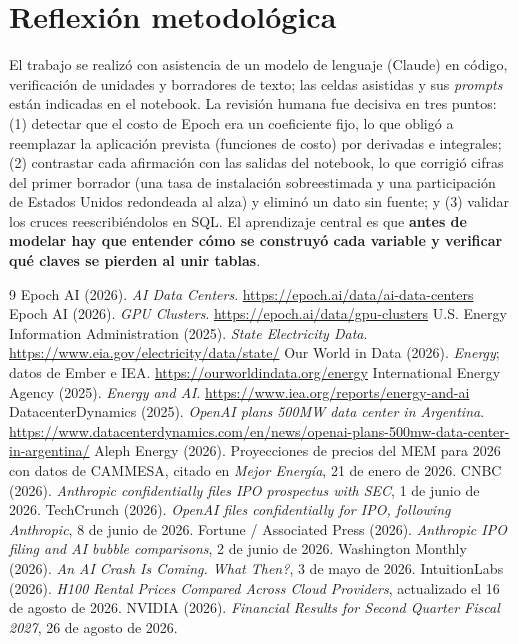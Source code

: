 \documentclass[11pt,a4paper]{article}
\begin{document}
\section{Reflexión metodológica}

El trabajo se realizó con asistencia de un modelo de lenguaje (Claude) en código, verificación de unidades y borradores de texto; las celdas asistidas y sus \emph{prompts} están indicadas en el notebook. La revisión humana fue decisiva en tres puntos: (1) detectar que el costo de Epoch era un coeficiente fijo, lo que obligó a reemplazar la aplicación prevista (funciones de costo) por derivadas e integrales; (2) contrastar cada afirmación con las salidas del notebook, lo que corrigió cifras del primer borrador (una tasa de instalación sobreestimada y una participación de Estados Unidos redondeada al alza) y eliminó un dato sin fuente; y (3) validar los cruces reescribiéndolos en SQL. El aprendizaje central es que \textbf{antes de modelar hay que entender cómo se construyó cada variable y verificar qué claves se pierden al unir tablas}.

\begin{thebibliography}{9}\small
{} Epoch AI (2026). \emph{AI Data Centers}. \url{https://epoch.ai/data/ai-data-centers}
 Epoch AI (2026). \emph{GPU Clusters}. \url{https://epoch.ai/data/gpu-clusters}
 U.S. Energy Information Administration (2025). \emph{State Electricity Data}. \url{https://www.eia.gov/electricity/data/state/}
 Our World in Data (2026). \emph{Energy}; datos de Ember e IEA. \url{https://ourworldindata.org/energy}
 International Energy Agency (2025). \emph{Energy and AI}. \url{https://www.iea.org/reports/energy-and-ai}
 DatacenterDynamics (2025). \emph{OpenAI plans 500MW data center in Argentina}. \url{https://www.datacenterdynamics.com/en/news/openai-plans-500mw-data-center-in-argentina/}
 Aleph Energy (2026). Proyecciones de precios del MEM para 2026 con datos de CAMMESA, citado en \emph{Mejor Energía}, 21 de enero de 2026.
 CNBC (2026). \emph{Anthropic confidentially files IPO prospectus with SEC}, 1 de junio de 2026.
 TechCrunch (2026). \emph{OpenAI files confidentially for IPO, following Anthropic}, 8 de junio de 2026.
 Fortune / Associated Press (2026). \emph{Anthropic IPO filing and AI bubble comparisons}, 2 de junio de 2026.
 Washington Monthly (2026). \emph{An AI Crash Is Coming. What Then?}, 3 de mayo de 2026.
 IntuitionLabs (2026). \emph{H100 Rental Prices Compared Across Cloud Providers}, actualizado el 16 de agosto de 2026.
 NVIDIA (2026). \emph{Financial Results for Second Quarter Fiscal 2027}, 26 de agosto de 2026.
\end{thebibliography}
\end{document}
